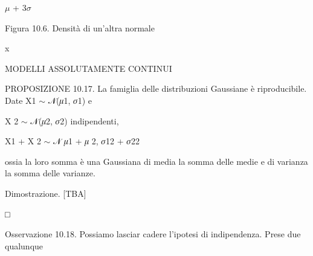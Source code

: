 \documentclass[a4paper,portrait,12pt]{article}
\begin{document}
\begin{flushleft}
$\mu$ + 3$\sigma$
\end{flushleft}





\begin{flushleft}
Figura 10.6. Densit\`{a} di un'altra normale
\end{flushleft}





\begin{flushleft}
x
\end{flushleft}










\begin{flushleft}
MODELLI ASSOLUTAMENTE CONTINUI
\end{flushleft}





\begin{flushleft}
PROPOSIZIONE 10.17. La famiglia delle distribuzioni Gaussiane \`{e} riproducibile. Date X1 $\sim$ 𝒩(𝜇1, 𝜎1) e
\end{flushleft}


\begin{flushleft}
X 2 $\sim$ 𝒩(𝜇2, 𝜎2) indipendenti,
\end{flushleft}


\begin{flushleft}
X1 + X 2 $\sim$ 𝒩 𝜇1 + 𝜇 2, 𝜎12 + 𝜎22
\end{flushleft}


\begin{flushleft}
ossia la loro somma \`{e} una Gaussiana di media la somma delle medie e di varianza la somma delle varianze.
\end{flushleft}


\begin{flushleft}
Dimostrazione. [TBA]
\end{flushleft}





□





\begin{flushleft}
Osservazione 10.18. Possiamo lasciar cadere l'ipotesi di indipendenza. Prese due qualunque
\end{flushleft}
\end{document}
